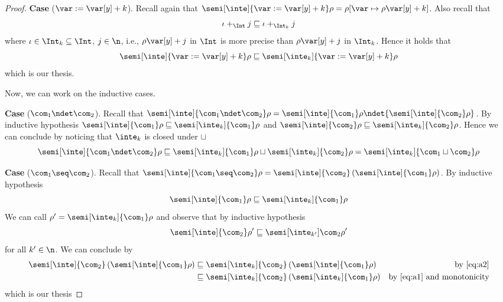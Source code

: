 \begin{proof}
  \medskip

  \noindent
  \textbf{Case} (\(\var := \var[y] + k\)).
  Recall again that
  \({\semi[\inte]{\var := \var[y] + k}\rho} = {\rho[\var \mapsto
    \rho\var[y] + k]}\). Also recall that
  \begin{equation*}
    \iota +_{\Int} j \sqsubseteq \iota +_{\Int_k} j
  \end{equation*}
  where \(\iota \in \Int_k \subseteq \Int\), \(j\in\n\), i.e.,
  \(\rho\var[y] + j\) in \(\Int\) is more precise than
  \(\rho\var[y] + j\) in \(\Int_k\). Hence it holds that
  \begin{equation*}
    {\semi[\inte]{\var := \var[y] + k}\rho} \sqsubseteq {\semi[\inte_k]{\var := \var[y] + k}\rho}
  \end{equation*}
  which is our thesis.

  \medskip
  \noindent
  Now, we can work on the inductive cases.

  \medskip

  \noindent
  \textbf{Case} (\(\com_1 \ndet \com_2\)).
  Recall that
  \({\semi[\inte]{\com_1 \ndet \com_2}\rho} =
  {\semi[\inte]{\com_1}\rho} \ndet {\semi[\inte]{\com_2}\rho}\). By
  inductive hypothesis
  \({\semi[\inte]{\com_1}\rho} \sqsubseteq
  {\semi[\inte_k]{\com_1}\rho}\) and
  \({\semi[\inte]{\com_2}\rho} \sqsubseteq
  {\semi[\inte_k]{\com_2}\rho}\). Hence we can conclude by noticing
  that \(\inte_k\) is closed under \(\sqcup\)
  \begin{equation*}
    \semi[\inte]{\com_1 \ndet \com_2}\rho \sqsubseteq
    \semi[\inte_k]{\com_1}\rho \sqcup \semi[\inte_k]{\com_2}\rho =
    \semi[\inte_k]{\com_1 \sqcup \com_2}\rho
  \end{equation*}

  \medskip

  \noindent
  \textbf{Case} (\(\com_1 \seq \com_2\)).
  Recall that
  \({\semi[\inte]{\com_1 \seq \com_2}\rho} =
  {\semi[\inte]{\com_2}\left(\semi[\inte]{\com_1}\rho\right)}\). By
  inductive hypothesis
  \begin{equation}\label{eq:a1}
    {\semi[\inte]{\com_1}\rho} \sqsubseteq {\semi[\inte_k]{\com_1}\rho}
  \end{equation}
  We can call \(\rho' = {\semi[\inte_k]{\com_1}\rho}\) and observe
  that by inductive hypothesis
  \begin{equation}\label{eq:a2}
    {\semi[\inte]{\com_2}\rho'} \sqsubseteq {\semi[\inte_{k'}]{\com_2}\rho'}
  \end{equation}
  for all \(k'\in\n\). We can conclude by
  \begin{align*}
    {\semi[\inte]{\com_2}\left(\semi[\inte]{\com_1}\rho\right)} & \sqsubseteq {\semi[\inte_k]{\com_2}\left(\semi[\inte]{\com_1}\rho\right)} & \text{by \eqref{eq:a2}}\\
                                                                & \sqsubseteq {\semi[\inte_k]{\com_2}\left(\semi[\inte_k]{\com_1}\rho\right)} & \text{by \eqref{eq:a1} and monotonicity}
  \end{align*}
  which is our thesis


\end{proof}

